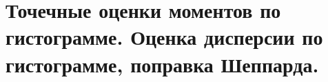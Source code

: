 \documentclass[polytech/stats/exam-2023/stats-exam-2023.tex]{subfiles}
\begin{document}
\section{Точечные оценки моментов по гистограмме. Оценка дисперсии по гистограмме, поправка Шеппарда.}
\end{document}
